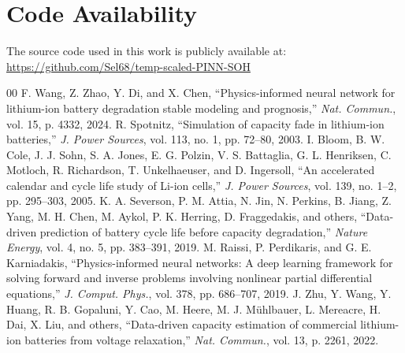 \documentclass[conference]{IEEEtran}
\begin{document}
\section{Code Availability}
The source code used in this work is publicly available at:
\url{https://github.com/Sel68/temp-scaled-PINN-SOH}

\newpage
\FloatBarrier
\begin{thebibliography}{00}
F. Wang, Z. Zhao, Y. Di, and X. Chen, ``Physics-informed neural network for lithium-ion battery degradation stable modeling and prognosis,'' \textit{Nat. Commun.}, vol. 15, p. 4332, 2024.
R. Spotnitz, ``Simulation of capacity fade in lithium-ion batteries,'' \textit{J. Power Sources}, vol. 113, no. 1, pp. 72--80, 2003.
I. Bloom, B. W. Cole, J. J. Sohn, S. A. Jones, E. G. Polzin, V. S. Battaglia, G. L. Henriksen, C. Motloch, R. Richardson, T. Unkelhaeuser, and D. Ingersoll, ``An accelerated calendar and cycle life study of Li-ion cells,'' \textit{J. Power Sources}, vol. 139, no. 1--2, pp. 295--303, 2005.
K. A. Severson, P. M. Attia, N. Jin, N. Perkins, B. Jiang, Z. Yang, M. H. Chen, M. Aykol, P. K. Herring, D. Fraggedakis, and others, ``Data-driven prediction of battery cycle life before capacity degradation,'' \textit{Nature Energy}, vol. 4, no. 5, pp. 383--391, 2019.
M. Raissi, P. Perdikaris, and G. E. Karniadakis, ``Physics-informed neural networks: A deep learning framework for solving forward and inverse problems involving nonlinear partial differential equations,'' \textit{J. Comput. Phys.}, vol. 378, pp. 686--707, 2019.
J. Zhu, Y. Wang, Y. Huang, R. B. Gopaluni, Y. Cao, M. Heere, M. J. M\"{u}hlbauer, L. Mereacre, H. Dai, X. Liu, and others, ``Data-driven capacity estimation of commercial lithium-ion batteries from voltage relaxation,'' \textit{Nat. Commun.}, vol. 13, p. 2261, 2022.
\end{thebibliography}
\end{document}
